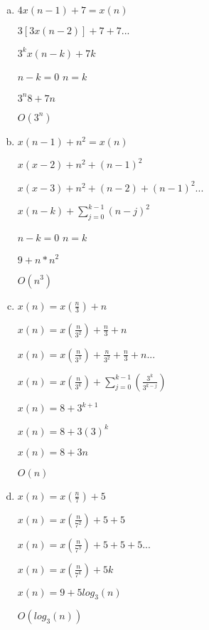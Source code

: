 \documentclass{article}
\begin{document}
\begin{enumerate}
\begin{enumerate}[(a)]
    \item $4x(n-1)+7=x(n)$

          $3[3x(n-2)]+7+7...$

          $3^{k}x(n-k)+7k$

          $n-k=0$ $n=k$

          $3^{n}8+7n$

          $O(3^n)$

    \item $x(n-1)+n^2=x(n)$

          $x(x-2)+n^2+(n-1)^2$

          $x(x-3)+n^2+(n-2)+(n-1)^2...$

          $x(n-k)+\sum_{j=0}^{k-1}(n-j)^2$

          $n-k=0$ $n=k$

          $9+n*n^2$

          $O(n^3)$

    \item $x(n) = x(\frac{n}{3})+n$

          $x(n) = x(\frac{n}{3^{2}})+\frac{n}{3}+n$

          $x(n) = x(\frac{n}{3^{3}})+\frac{n}{3^2}+\frac{n}{3}+n...$

          $x(n) = x(\frac{n}{3^k})+\sum_{j=0}^{k-1}(\frac{3^k}{3^{k-j}})$

          $x(n) = 8 + 3^{k+1}$

          $x(n) = 8 + 3(3)^{k}$

          $x(n) = 8 + 3n$

          $O(n)$



    \item $x(n) = x(\frac{n}{7})+5$

          $x(n) = x(\frac{n}{7^{2}})+5+5$

          $x(n) = x(\frac{n}{7^{3}})+5+5+5...$

          $x(n) = x(\frac{n}{7^k})+5k$

          $x(n) = 9+5log_{3}(n)$

          $O(log_{3}(n))$





  \end{enumerate}


\end{enumerate}
\end{document}

